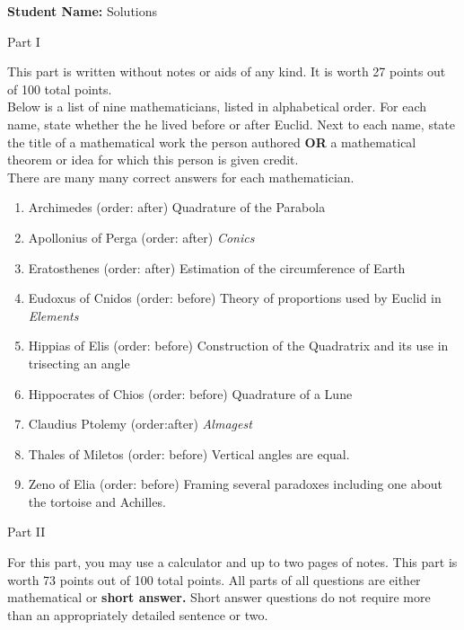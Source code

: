 \documentclass[11pt]{article}
\def\bc{\begin{center}}
\def\ec{\end{center}}
\def\be{\begin{enumerate}}
\def\ee{\end{enumerate}}
\begin{document}
\thispagestyle{fancy}

\vspace{1in}

\textbf{Student Name:} Solutions

\vspace{1in}



\bc Part I \ec

This part is written without notes or aids of any kind. It is worth 27 points out of 100 total points. \\

Below is a list of nine mathematicians, listed in alphabetical order. For each name, state whether the he lived before or after Euclid. Next to each name, state the title of a mathematical work the person authored \textbf{OR} a mathematical theorem or idea for which this person is given credit.\\

There are many many correct answers for each mathematician.

\be
\item Archimedes (order: after) Quadrature of the Parabola
\item Apollonius of Perga (order: after) \textit{Conics}
\item Eratosthenes (order: after) Estimation of the circumference of Earth
\item Eudoxus of Cnidos (order: before) Theory of proportions used by Euclid in \textit{Elements}


\item Hippias of Elis (order: before) Construction of the Quadratrix and its use in trisecting an angle

\item Hippocrates of Chios (order: before) Quadrature of a Lune
\item Claudius Ptolemy (order:after) \textit{Almagest}
\item Thales of Miletos (order: before) Vertical angles are equal.
\item Zeno of Elia (order: before) Framing several paradoxes including one about the tortoise and Achilles.

\ee
\bc Part II \ec

For this part, you may use a calculator and up to two pages of notes. This part is worth 73 points out of 100 total points. All parts of all questions are either mathematical or \textbf{short answer.} Short answer questions do not require more than an appropriately detailed sentence or two.
\end{document}
